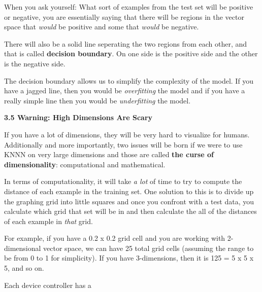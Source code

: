 \documentclass{article}
\begin{document}
\large When you ask yourself: What sort of examples from the test set will be positive or negative, you are essentially saying that there will be regions in the vector space that \textit{would} be positive and some that \textit{would} be negative.

\vspace{0.5cm}

There will also be a solid line seperating the two regions from each other, and that is called \textbf{decision boundary}. On one side is the positive side and the other is the negative side.

\vspace{0.5cm}

The decision boundary allows us to simplify the complexity of the model. If you have a jagged line, then you would be \textit{overfitting} the model and if you have a really simple line then you would be \textit{underfitting} the model.

\vspace{0.5cm}

\newpage

\LARGE \textbf{3.5 Warning: High Dimensions Are Scary}

\vspace{0.7cm}

\large If you have a lot of dimensions, they will be very hard to visualize for humans. Additionally and more importantly, two issues will be born if we were to use KNNN on very large dimensions and those are called \textbf{the curse of dimensionality}: computational and mathematical.

In terms of computationality, it will take \textit{a lot} of time to try to compute the distance of each example in the training set. One solution to this is to divide up the graphing grid into little squares and once you confront with a test data, you calculate which grid that set will be in and then calculate the all of the distances of each example in \textit{that} grid.

\vspace{0.5cm}

For example, if you have a 0.2 x 0.2 grid cell and you are working with 2-dimensional vector space, we can have 25 total grid cells (assuming the range to be from 0 to 1 for simplicity).
If you have 3-dimensions, then it is 125 = 5 x 5 x 5, and so on.

Each device controller has a 

\vspace{0.5cm}
\end{document}
